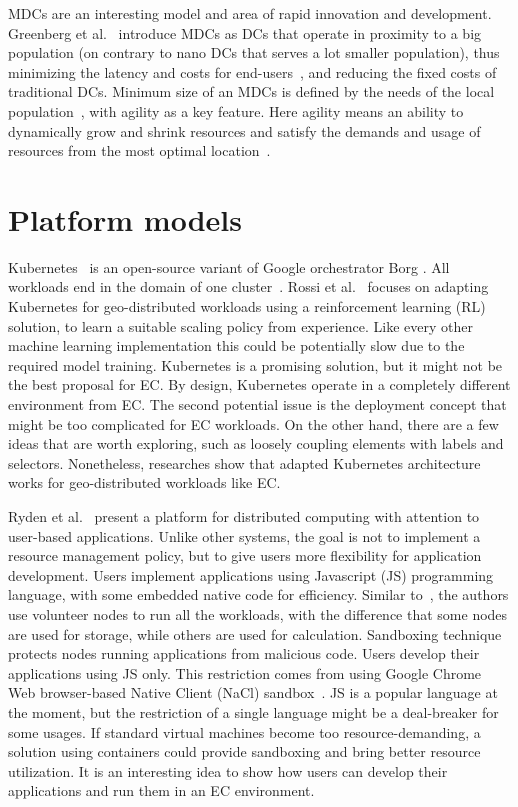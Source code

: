 MDCs are an interesting model and area of rapid innovation and development. Greenberg et al.~\cite{GreenbergHMP09} introduce MDCs as DCs that operate in proximity to a big population (on contrary to nano DCs that serves a lot smaller population), thus minimizing the latency and costs for end-users~\cite{ShiHPANZ14, GreenbergHMP09}, 
and reducing the fixed costs of traditional DCs. Minimum size of an MDCs is defined by the needs of the local population~\cite{GreenbergHMP09, AbbasZTS18}, with agility as a key feature. Here agility means an ability to dynamically grow and shrink resources and satisfy the demands and usage of resources from the most optimal location~\cite{GreenbergHMP09}.
%
%
\section{Platform models}\label{sec:platform_models}
%
Kubernetes~\cite{BurnsGOBW16} is an open-source variant of Google orchestrator Borg \cite{VermaPKOTW15}.  All workloads end in the domain of one cluster~\cite{BurnsGOBW16, VermaPKOTW15, RossiCPN20}. Rossi et al.~\cite{RossiCPN20} focuses on adapting Kubernetes for geo-distributed workloads using a reinforcement learning (RL) solution, to learn a suitable scaling policy from experience. Like every other machine learning implementation this could be potentially slow due to the required model training. Kubernetes is a promising solution, but it might not be the best proposal for EC. By design, Kubernetes operate in a completely different environment from EC. The second potential issue is the deployment concept that might be too complicated for EC workloads. On the other hand, there are a few ideas that are worth exploring, such as loosely coupling elements with labels and selectors. Nonetheless, researches show that adapted Kubernetes architecture works for geo-distributed workloads like EC.

{Ryden et al.~\cite{RydenOCW14}} present a platform for distributed computing with attention to user-based applications. Unlike other systems, the goal is not to implement a resource management policy, but to give users more flexibility for application development. Users implement applications using Javascript (JS) programming language, with some embedded native code for efficiency. Similar to~\cite{CiobanuNPDMM19}, the authors use volunteer nodes to run all the workloads, with the difference that some nodes are used for storage, while others are used for calculation. Sandboxing technique protects nodes running applications from malicious code. Users develop their applications using JS only. This restriction comes from using Google Chrome Web browser-based Native Client (NaCl) sandbox~\cite{YeeSDCMOONF10}. JS is a popular language at the moment, but the restriction of a single language might be a deal-breaker for some usages. If standard virtual machines become too resource-demanding, a solution using containers could provide sandboxing and bring better resource utilization. It is an interesting idea to show how users can develop their applications and run them in an EC environment.

